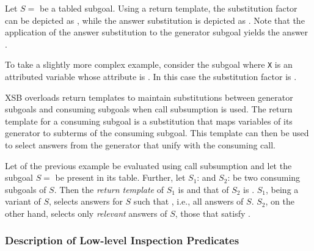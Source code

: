 \begin{description}
\begin{example}
Let $S =$  be a tabled subgoal.  Using a return
template, the substitution factor can be depicted as ,
while the answer substitution  is depicted as
.  Note that the application of the answer substitution
to the generator subgoal yields the answer .

To take a slightly more complex example, consider the subgoal
 where {\tt X} is an attributed variable whose attribute is
.  In this case the substitution factor is
.\fillBox
\end{example}

XSB overloads return templates to maintain substitutions between
generator subgoals and consuming subgoals when call subsumption is
used.  The return template for a consuming subgoal is a substitution
that maps variables of its generator to subterms of the consuming
subgoal.  This template can then be used to select answers from the
generator that unify with the consuming call.

\begin{example}
Let  of the previous example be evaluated using call
subsumption and let the subgoal $S =$  be present in
its table.  Further, let $S_1$:  and $S_2$:
 be two consuming subgoals of $S$\@.  Then the
\emph{return template} of $S_1$ is  and that of $S_2$
is .  $S_1$, being a variant of $S$, selects answers
for $S$ such that \@, i.e., all answers of $S$.
$S_2$, on the other hand, selects only \emph{relevant} answers of $S$,
those that satisfy .\fillBox
\end{example}


\subsubsection*{Description of Low-level Inspection Predicates}
\begin{description}



\end{description}
\end{description}
